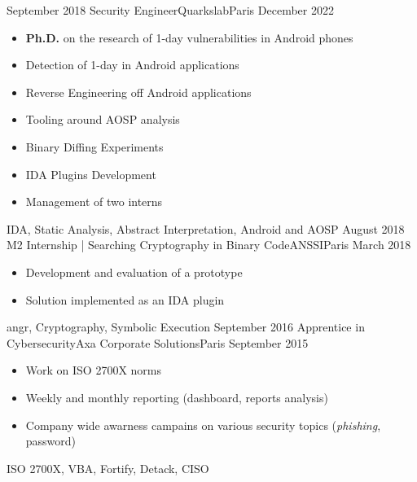

\begin{experiences}
  \experience
  {September 2018} {Security Engineer}{Quarkslab}{Paris}
  {December 2022}{
    \begin{itemize}[topsep=0pt,itemsep=1ex,partopsep=0ex,parsep=0ex]
      \item \textbf{Ph.D.} on the research of 1-day vulnerabilities in Android phones
      \item Detection of 1-day in Android applications
      \item Reverse Engineering off Android applications
      \item Tooling around AOSP analysis
      \item Binary Diffing Experiments
      \item IDA Plugins Development
      \item Management of two interns
    \end{itemize}
  }
  { IDA, Static Analysis, Abstract Interpretation, Android and AOSP}
  \emptySeparator
  \experience
    {August 2018}   {M2 Internship | Searching Cryptography in Binary Code}{ANSSI}{Paris}
    {March 2018} {
                      \begin{itemize}[topsep=0pt,itemsep=1ex,partopsep=0ex,parsep=0ex]
                        \item Development and evaluation of a prototype
                        \item Solution implemented as an IDA plugin
                      \end{itemize}
                    }
                    {angr, Cryptography, Symbolic Execution}
  \emptySeparator
  \experience
    {September 2016} {Apprentice in Cybersecurity}{Axa Corporate Solutions}{Paris}
    {September 2015}    {
                      \begin{itemize}[topsep=0pt,itemsep=1ex,partopsep=0ex,parsep=0ex]
                        \item Work on ISO 2700X norms
                        \item Weekly and monthly reporting (dashboard, reports analysis)
                        \item Company wide awarness campains on various security topics (\emph{phishing}, password)
                      \end{itemize}
                    }
                    {ISO 2700X, VBA, Fortify, Detack, CISO}
\end{experiences}
